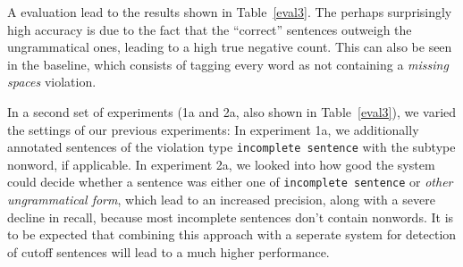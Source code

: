 \documentclass[a4paper,10pt]{scrartcl}
\begin{document}
A evaluation lead to the results shown in Table~\ref{eval3}. The perhaps surprisingly high accuracy is due to the fact that the ``correct'' sentences outweigh the ungrammatical ones, leading to a high true negative count. This can also be seen in the baseline, which consists of tagging every word as not containing a \textit{missing spaces} violation.

In a second set of experiments (1a and 2a, also shown in Table~\ref{eval3}), we varied the settings of our previous experiments: In experiment 1a, we additionally annotated sentences of the violation type \texttt{incomplete sentence} with the subtype nonword, if applicable. In experiment 2a, we looked into how good the system could decide whether a sentence was either one of \texttt{incomplete sentence} or \textit{other ungrammatical form}, which lead to an increased precision, along with a severe decline in recall, because most incomplete sentences don't contain nonwords. It is to be expected that combining this approach with a seperate system for detection of cutoff sentences will lead to a much higher performance.










\end{document}
